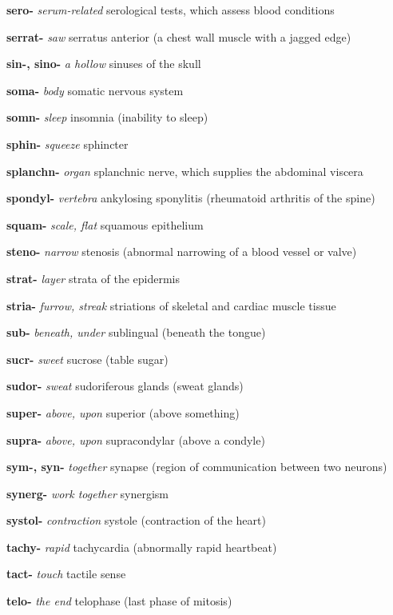 \documentclass[10pt]{article}
\begin{document}
\begin{multicols}{2}
\begin{hangparas}{10pt}{1}
 \textbf{sero-} \textit{serum-related} serological tests, which assess blood conditions \par
 \textbf{serrat-} \textit{saw} serratus anterior (a chest wall muscle with a jagged edge) \par
 \textbf{sin-, sino-} \textit{a hollow} sinuses of the skull \par
 \textbf{soma-} \textit{body} somatic nervous system \par
 \textbf{somn-} \textit{sleep} insomnia (inability to sleep) \par
 \textbf{sphin-} \textit{squeeze} sphincter \par
 \textbf{splanchn-} \textit{organ} splanchnic nerve, which supplies the abdominal viscera \par
 \textbf{spondyl-} \textit{vertebra} ankylosing sponylitis (rheumatoid arthritis of the spine) \par
 \textbf{squam-} \textit{scale, flat} squamous epithelium \par
 \textbf{steno-} \textit{narrow} stenosis (abnormal narrowing of a blood vessel or valve) \par
 \textbf{strat-} \textit{layer} strata of the epidermis \par
 \textbf{stria-} \textit{furrow, streak} striations of skeletal and cardiac muscle tissue \par
 \textbf{sub-} \textit{beneath, under} sublingual (beneath the tongue) \par
 \textbf{sucr-} \textit{sweet} sucrose (table sugar) \par
 \textbf{sudor-} \textit{sweat} sudoriferous glands (sweat glands) \par
 \textbf{super-} \textit{above, upon} superior (above something) \par
 \textbf{supra-} \textit{above, upon} supracondylar (above a condyle) \par
 \textbf{sym-, syn-} \textit{together} synapse (region of communication between two neurons) \par
 \textbf{synerg-} \textit{work together} synergism \par
 \textbf{systol-} \textit{contraction} systole (contraction of the heart) \par
 \textbf{tachy-} \textit{rapid} tachycardia (abnormally rapid heartbeat) \par
 \textbf{tact-} \textit{touch} tactile sense \par
 \textbf{telo-} \textit{the end} telophase (last phase of mitosis) \par

\end{hangparas}
\end{multicols}
\end{document}
